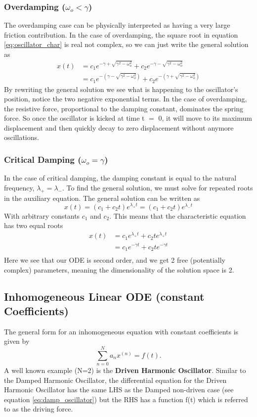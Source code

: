 \documentclass{article}
\newcommand{\be}{\begin{equation}}
\newcommand{\ee}{\end{equation}}
\begin{document}
\subsubsection*{Overdamping ($\omega_o < \gamma$)}
The overdamping case can be physically interpreted as having a very large friction contribution.
In the case of overdamping, the square root in equation \ref{eq:oscillator_char} is real not complex, so we can just write the general solution as
\be
\begin{split}
x(t) &= c_1 e^{-\gamma + \sqrt{\gamma^2 - \omega_o^2}} + c_2 e^{-\gamma - \sqrt{\gamma^2 - \omega_o^2}} \\
&= c_1 e^{-(\gamma - \sqrt{\gamma^2 - \omega_o^2})} + c_2 e^{-(\gamma + \sqrt{\gamma^2 - \omega_o^2})}
\end{split}
\ee
By rewriting the general solution we see what is happening to the oscillator's position, notice the two negative exponential terms.
In the case of overdamping, the resistive force, proportional to the damping constant, dominates the spring force.
So once the oscillator is kicked at time t $=$ 0, it will move to its maximum displacement and then quickly decay to zero displacement without anymore oscillations.

\subsubsection*{Critical Damping ($\omega_o = \gamma$)}
In the case of critical damping, the damping constant is equal to the natural frequency, $\lambda_+ = \lambda_-$.
To find the general solution, we must solve for repeated roots in the auxiliary equation.
The general solution can be written as
\be
x(t) = (c_1 + c_2t)e^{\lambda_+ t} = (c_1 + c_2t)e^{\lambda_- t}
\ee
With arbitrary constants $c_1$ and $c_2$.
This means that the characteristic equation has two equal roots
\be
\begin{split}
x(t) &= c_1 e^{\lambda_+ t} + c_2 te^{\lambda_+ t}\\
&= c_1 e^{-\gamma t} + c_2 te^{-\gamma t}\\
\end{split}
\ee
Here we see that our ODE is second order, and we get 2 free (potentially complex) parameters, meaning the dimensionality of the solution space is 2.

\subsection*{Inhomogeneous Linear ODE (constant Coefficients)}
The general form for an inhomogeneous equation with constant coefficients is given by
\be \label{eq:und_coeff_ex}
	\sum_{n=0}^N a_n x^{(n)} = f(t) .
\ee
A well known example (N=2) is the \textbf{Driven Harmonic Oscillator}.
Similar to the Damped Harmonic Oscillator, the differential equation for the Driven Harmonic Oscillator has the same LHS as the Damped non-driven case (see equation \ref{eq:damp_oscillator}) but the RHS has a function f(t) which is referred to as the driving force.
\end{document}
